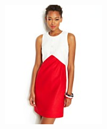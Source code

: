 \documentclass[11pt]{article}
\begin{document}
\begin{figure}
\begin{subfigure}{.18\textwidth}
\includegraphics[width=\linewidth]{concepts/concept2_pos5.jpg}
\end{subfigure}


\end{figure}
\end{document}
